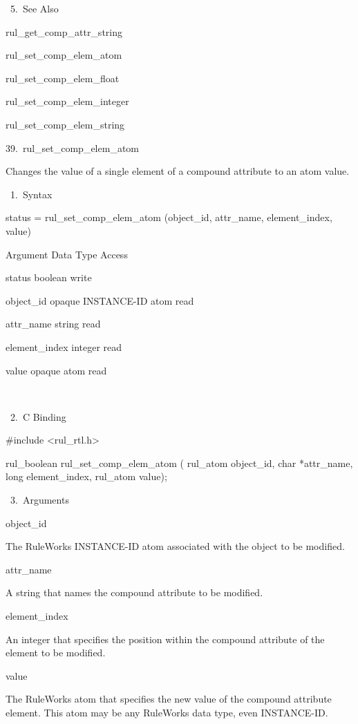 {       5. See Also

    rul_get_comp_attr_string

    rul_set_comp_elem_atom

    rul_set_comp_elem_float

    rul_set_comp_elem_integer

    rul_set_comp_elem_string

39. rul_set_comp_elem_atom

    Changes the value of a single element of a
    compound attribute to an atom value.

       1. Syntax

          status = rul_set_comp_elem_atom
          (object_id, attr_name,
          element_index, value)

          Argument  Data Type     Access

          status  boolean     write

          object_id  opaque INSTANCE-ID atom
           read

          attr_name  string     read

          element_index  integer     read

          value  opaque atom    read

           

       2. C Binding

          #include <rul_rtl.h>

          rul_boolean rul_set_comp_elem_atom (
          rul_atom object_id,
          char *attr_name,
          long element_index,
          rul_atom value);

       3. Arguments

          object_id

          The RuleWorks INSTANCE-ID atom
          associated with the object to be
          modified.

          attr_name

          A string that names the compound
          attribute to be modified.

          element_index

          An integer that specifies the
          position within the compound
          attribute of the element to be
          modified.

          value

          The RuleWorks atom that specifies
          the new value of the compound
          attribute element. This atom may be
          any RuleWorks data type, even
          INSTANCE-ID.

}
